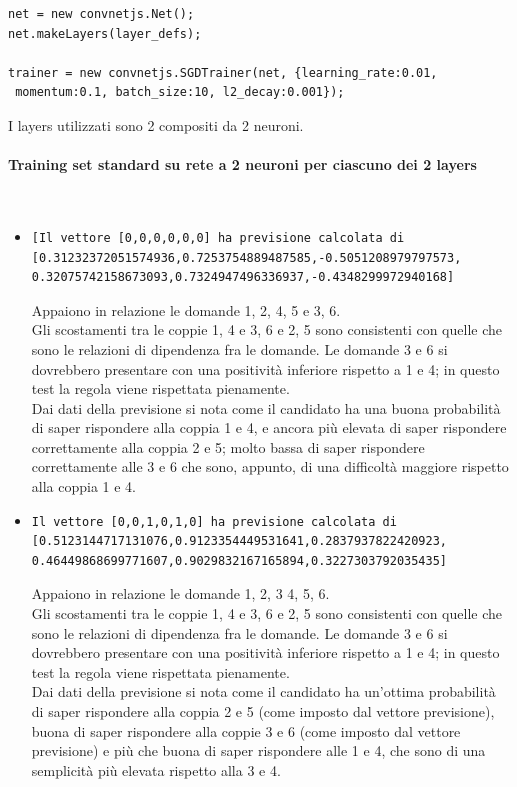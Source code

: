 \begin{itemize}
\begin{verbatim}
net = new convnetjs.Net();
net.makeLayers(layer_defs);

trainer = new convnetjs.SGDTrainer(net, {learning_rate:0.01,
 momentum:0.1, batch_size:10, l2_decay:0.001});
\end{verbatim}
\noindent
I layers utilizzati sono 2 compositi da 2 neuroni.

\paragraph{Training set standard su rete a 2 neuroni per ciascuno dei 2 layers}\mbox{}
\label{Training set standard su rete a 2 neuroni per ciascuno dei 2 layers}
\\
\noindent
\begin{itemize}
\item \begin{verbatim}[Il vettore [0,0,0,0,0,0] ha previsione calcolata di
[0.31232372051574936,0.7253754889487585,-0.5051208979797573,
0.32075742158673093,0.7324947496336937,-0.4348299972940168]
\end{verbatim}
Appaiono in relazione le domande 1, 2, 4, 5 e 3, 6.\\
Gli scostamenti tra le coppie 1, 4 e 3, 6  e 2, 5 sono consistenti con quelle che sono le relazioni di dipendenza fra le domande.
Le domande 3 e 6 si dovrebbero presentare con una positivit\`a inferiore rispetto a 1 e 4; in questo test la regola viene rispettata pienamente.\\
Dai dati della previsione si nota come il candidato ha una buona probabilit\`a di saper rispondere alla coppia 1 e 4, e ancora pi\`u elevata di saper rispondere correttamente alla coppia 2 e 5; molto bassa di saper rispondere correttamente alle 3 e 6 che sono, appunto, di una difficolt\`a maggiore rispetto alla coppia 1 e 4.

\item \begin{verbatim}Il vettore [0,0,1,0,1,0] ha previsione calcolata di
[0.5123144717131076,0.9123354449531641,0.2837937822420923,
0.46449868699771607,0.9029832167165894,0.3227303792035435]
\end{verbatim}
Appaiono in relazione le domande 1, 2, 3  4, 5, 6.\\
Gli scostamenti tra le coppie 1, 4 e 3, 6  e 2, 5 sono consistenti con quelle che sono le relazioni di dipendenza fra le domande.
Le domande 3 e 6 si dovrebbero presentare con una positivit\`a inferiore rispetto a 1 e 4; in questo test la regola viene rispettata pienamente.\\
Dai dati della previsione si nota come il candidato ha un'ottima probabilit\`a di saper rispondere alla coppia 2 e 5 (come imposto dal vettore previsione), buona di saper rispondere alla coppie 3 e 6 (come imposto dal vettore previsione) e pi\`u che buona  di saper rispondere alle 1 e 4, che sono di una semplicit\`a pi\`u elevata rispetto alla 3 e 4.
\end{itemize}


\end{itemize}
